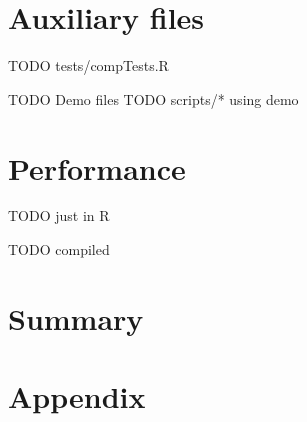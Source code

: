 \documentclass[nojss,shortnames,article]{jss}
\begin{document}
\section{Auxiliary files}

TODO tests/compTests.R

TODO Demo files
TODO scripts/* using demo

\section{Performance}

TODO just in R

TODO compiled

\section{Summary}




\section*{Appendix}

\end{document}
